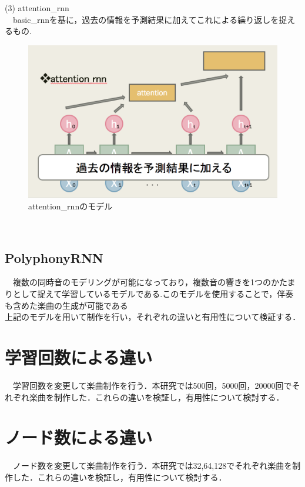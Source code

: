 \newpage
(3) attention\_rnn\\
　basic\_rnnを基に，過去の情報を予測結果に加えてこれによる繰り返しを捉えるもの.
\begin{figure}[!ht]
    \begin{screen}
    \begin{center}
        \includegraphics[scale=0.8,clip]{./img/attention1.png}
        \caption{attention\_rnnのモデル}
        \label{fig:attentio_rnnのモデル}
    \end{center}
    \end{screen}
\end{figure}\\
\subsection{PolyphonyRNN}
　複数の同時音のモデリングが可能になっており，複数音の響きを1つのかたまりとして捉えて学習しているモデルである.このモデルを使用することで，伴奏も含めた楽曲の生成が可能である\\
上記のモデルを用いて制作を行い，それぞれの違いと有用性について検証する．
\newpage
\section{学習回数による違い}
　学習回数を変更して楽曲制作を行う．本研究では500回，5000回，20000回でそれぞれ楽曲を制作した．これらの違いを検証し，有用性について検討する．
\section{ノード数による違い}
　ノード数を変更して楽曲制作を行う．本研究では32,64,128でそれぞれ楽曲を制作した．これらの違いを検証し，有用性について検討する．